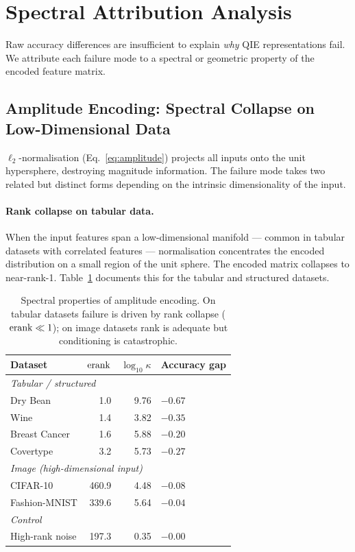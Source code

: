 \section{Spectral Attribution Analysis}
\label{sec:analysis}

Raw accuracy differences are insufficient to explain \emph{why} QIE
representations fail.
We attribute each failure mode to a spectral or geometric property of the
encoded feature matrix.

\subsection{Amplitude Encoding: Spectral Collapse on Low-Dimensional Data}
\label{sec:amplitude}

$\ell_2$-normalisation (Eq.~\ref{eq:amplitude}) projects all inputs onto the
unit hypersphere, destroying magnitude information.
The failure mode takes two related but distinct forms depending on the
intrinsic dimensionality of the input.

\paragraph{Rank collapse on tabular data.}
When the input features span a low-dimensional manifold — common in tabular
datasets with correlated features — normalisation concentrates the encoded
distribution on a small region of the unit sphere.
The encoded matrix collapses to near-rank-1.
Table~\ref{tab:spectral_amplitude} documents this for the tabular and
structured datasets.

\begin{table}[tbp]
\centering
\caption{Spectral properties of amplitude encoding.  On tabular datasets
failure is driven by rank collapse ($\mathrm{erank} \ll 1$); on image datasets rank
is adequate but conditioning is catastrophic.}
\label{tab:spectral_amplitude}
\small
\begin{tabular}{lrrl}
\toprule
Dataset & $\mathrm{erank}$ & $\log_{10}\kappa$ & Accuracy gap \\
\midrule
\multicolumn{4}{l}{\textit{Tabular / structured}} \\
Dry Bean        &     1.0 &  9.76 & $-0.67$ \\
Wine            &     1.4 &  3.82 & $-0.35$ \\
Breast Cancer   &     1.6 &  5.88 & $-0.20$ \\
Covertype       &     3.2 &  5.73 & $-0.27$ \\
\midrule
\multicolumn{4}{l}{\textit{Image (high-dimensional input)}} \\
CIFAR-10        &   460.9 &  4.48 & $-0.08$ \\
Fashion-MNIST   &   339.6 &  5.64 & $-0.04$ \\
\midrule
\multicolumn{4}{l}{\textit{Control}} \\
High-rank noise & 197.3   &  0.35 & $-0.00$ \\
\bottomrule
\end{tabular}
\end{table}

